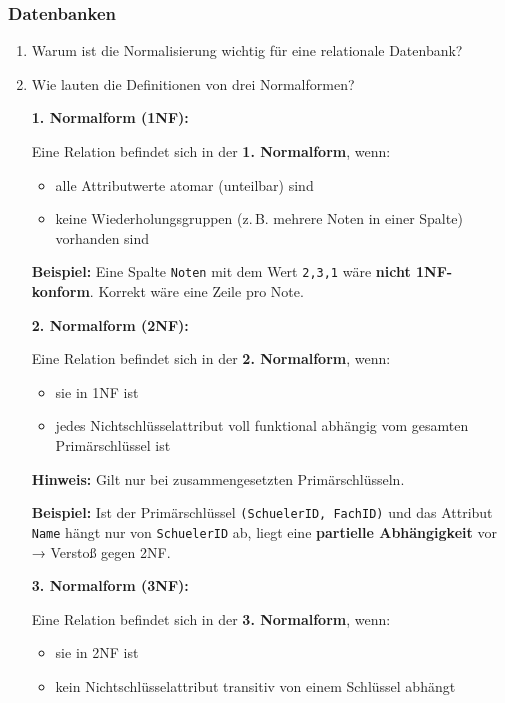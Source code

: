 \documentclass[a4paper,12pt]{article}
\begin{document}
\subsubsection*{Datenbanken}		
		\begin{enumerate}
			\item Warum ist die Normalisierung wichtig für eine relationale Datenbank?
			\item Wie lauten die Definitionen von drei Normalformen?
			
			\textbf{1. Normalform (1NF):}
			
			Eine Relation befindet sich in der \textbf{1. Normalform}, wenn:
			\begin{itemize}
				\item alle Attributwerte atomar (unteilbar) sind
				\item keine Wiederholungsgruppen (z.\,B. mehrere Noten in einer Spalte) vorhanden sind
			\end{itemize}
			
			\textbf{Beispiel:}  
			Eine Spalte \texttt{Noten} mit dem Wert \texttt{2,3,1} wäre \textbf{nicht 1NF-konform}.  
			Korrekt wäre eine Zeile pro Note.
			
			\vspace{1em}
			
			\textbf{2. Normalform (2NF):}
			
			Eine Relation befindet sich in der \textbf{2. Normalform}, wenn:
			\begin{itemize}
				\item sie in 1NF ist
				\item jedes Nichtschlüsselattribut voll funktional abhängig vom gesamten Primärschlüssel ist
			\end{itemize}
			
			\textbf{Hinweis:} Gilt nur bei zusammengesetzten Primärschlüsseln.
			
			\textbf{Beispiel:}  
			Ist der Primärschlüssel \texttt{(SchuelerID, FachID)} und das Attribut \texttt{Name} hängt nur von \texttt{SchuelerID} ab, liegt eine \textbf{partielle Abhängigkeit} vor → Verstoß gegen 2NF.
			
			\vspace{1em}
			
			\textbf{3. Normalform (3NF):}
			
			Eine Relation befindet sich in der \textbf{3. Normalform}, wenn:
			\begin{itemize}
				\item sie in 2NF ist
				\item kein Nichtschlüsselattribut transitiv von einem Schlüssel abhängt
			\end{itemize}
			

\end{enumerate}
\end{document}
